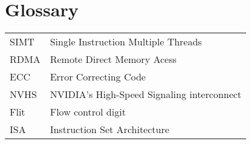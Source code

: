 \section{Glossary}

\begin{tabular}{l l}
SIMT & Single Instruction Multiple Threads \\
RDMA & Remote Direct Memory Acess \\
ECC & Error Correcting Code \\
NVHS & NVIDIA's High-Speed Signaling interconnect \\
Flit & Flow control digit \\
ISA & Instruction Set Architecture \\
\end{tabular}

